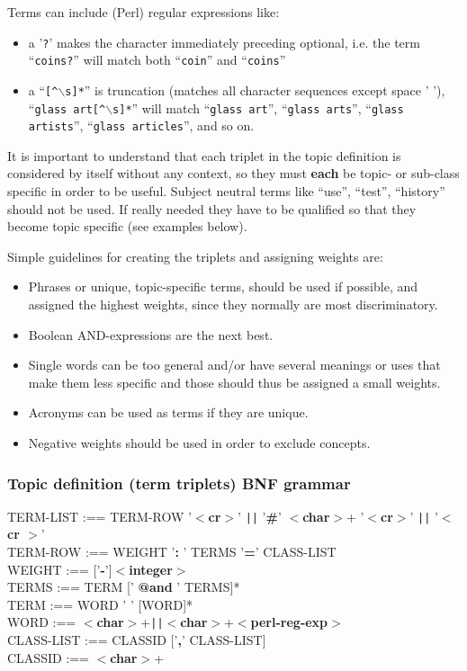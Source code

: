 Terms can include (Perl) regular expressions like:
\begin{itemize}
  \item a '{\tt ?}' makes the character immediately preceding optional, i.e.
      the term ``{\tt coins?}'' will match both ``{\tt coin}'' and ``{\tt coins}''
  \item a ``{\tt [\^{ }$\backslash$s]*}'' is truncation (matches all
      character sequences except space ' '),\\
      ``{\tt glass art[\^{ }$\backslash$s]*}'' will match 
      ``{\tt glass art}'', ``{\tt glass arts}'', ``{\tt glass
      artists}'', ``{\tt glass articles}'', and so on.
\end{itemize}

It is important to understand that each triplet in the topic definition
 is considered by itself
without any context, so they must {\bf each} be topic- or sub-class specific in order to
be useful. Subject neutral terms like ``use'', ``test'', ``history'' should
not be used.
If really needed they have to be qualified so that they become topic
specific (see examples below).

\hspace{-\parindent}Simple guidelines for creating the triplets and assigning weights are:
\begin{itemize}
  \item   Phrases or unique, topic-specific terms, 
 should be used if possible, and
    assigned the highest weights, since they normally are most discriminatory.
  \item   Boolean AND-expressions are the next best.
  \item   Single words can be too general and/or have several meanings or uses
    that make them less specific and those should thus be assigned
    a small weights.
  \item   Acronyms can be used as terms if they are unique.
  \item   Negative weights should be used in order to exclude concepts.
\end{itemize}

\label{termlist}
\subsubsection{Topic definition (term triplets) BNF grammar}
TERM-LIST :== TERM-ROW '{\bf$<$cr$>$}' \verb+||+ '{\bf\#}' {\bf $<$char$>$}+ '{\bf$<$cr$>$}' \verb+||+ '{\bf$<$cr
$>$}' \\
TERM-ROW :== WEIGHT '{\bf: }' TERMS '{\bf=}' CLASS-LIST  \\
WEIGHT :== ['{\bf-}']{\bf$<$integer$>$}  \\
TERMS :== TERM [' {\bf @and} ' TERMS]*  \\
TERM :== WORD ' ' [WORD]*   \\
WORD :== {\bf$<$char$>$}+\verb+||+{\bf$<$char$>$}+{\bf$<$perl-reg-exp$>$}  \\
CLASS-LIST :== CLASSID ['{\bf,}' CLASS-LIST]  \\
CLASSID :== {\bf$<$char$>$}+  \\

